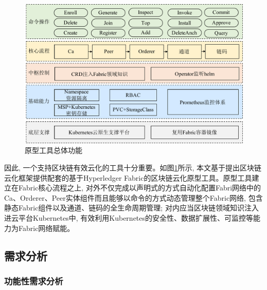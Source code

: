 \begin{figure}[!htbp] %
    \centering %
    \includegraphics[width=1.0\textwidth]{FIGs/chapter4/tool.pdf} %
    \caption{原型工具总体功能} %
    \label{toolstotal} %
\end{figure}%

因此, 一个支持区块链有效云化的工具十分重要。如图\ref{toolstotal}所示, 本文基于提出区块链云化框架提供配套的基于Hyperledger Fabric的区块链云化原型工具。原型工具建立在Fabric核心流程之上, 对外不仅完成以声明式的方式自动化配置Fabri网络中的Ca、Orderer、Peer实体组件而且能够以命令的方式动态管理整个Fabric网络, 包含静态Fabric组件以及通道、链码的全生命周期管理; 对内应当区块链领域知识注入进云平台Kubernetes中, 有效利用Kubernetes的安全性、数据扩展性、可监控等能力为Fabric网络赋能。



\subsection{需求分析}

\subsubsection{功能性需求分析}

